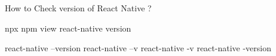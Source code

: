 How to Check version of React Native ?

npx npm view react-native version

react-native --version
react-native --v
react-native -v
react-native -version
